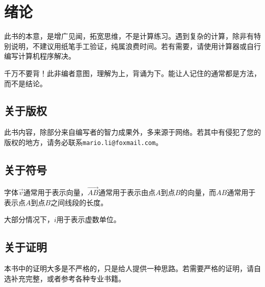 
\chapter{绪论}
\label{chap:introduction}

此书的本意，是增广见闻，拓宽思维，不是计算练习。遇到复杂的计算，除非有特别说明，不建议用纸笔手工验证，纯属浪费时间。若有需要，请使用计算器或自行编写计算机程序解决。

千万不要背！此非编者意图，理解为上，背诵为下。能让人记住的通常都是方法，而不是结论。

\section{关于版权}
\label{sec:copyright}

此书内容，除部分来自编写者的智力成果外，多来源于网络。若其中有侵犯了您的版权的地方，请务必联系\verb|mario.li@foxmail.com|。

\section{关于符号}
\label{sec:symbol}

字体$\vec{v}$通常用于表示向量，$\vec{AB}$通常用于表示由点$A$到点$B$的向量，而$AB$通常用于表示点$A$到点$B$之间线段的长度。

大部分情况下，$i$用于表示虚数单位。

\section{关于证明}
\label{sec:about-proof}

本书中的证明大多是不严格的，只是给人提供一种思路。若需要严格的证明，请自选补充完整，或者参考各种专业书籍。